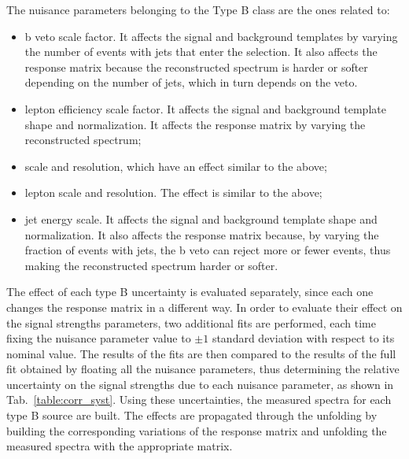 The nuisance parameters belonging to the Type B class are the ones related to:
\begin{itemize}
\item b veto scale factor. It affects the signal and background templates
by varying the number of events with jets that enter the selection. It also
affects the response matrix because the reconstructed spectrum is harder or softer depending on the number of jets, which in turn depends on the veto. 
\item lepton efficiency scale factor. It affects the signal and background
template shape and normalization. It affects the response matrix by varying
the reconstructed spectrum;
\item \MET scale and resolution, which have an effect similar to the above;
\item lepton scale and resolution. The effect is similar to the above;
\item jet energy scale. It affects the signal and background template shape
and normalization. It also affects the response matrix because, by varying the
fraction of events with jets, the b veto can reject more or fewer events, thus
making the reconstructed spectrum harder or softer.
\end{itemize}
The effect of each type B uncertainty is evaluated separately,
since each one changes the response matrix in a different way.
In order to evaluate their effect on the signal strengths parameters, two additional fits are
performed, each time fixing  the nuisance parameter value to $\pm 1$  standard
deviation with respect
to its nominal value. The results of the fits are then compared to the results of the full fit obtained by floating  all the nuisance parameters, thus 
determining the relative uncertainty on the signal strengths due to each
nuisance parameter, as shown in Tab.~\ref{table:corr_syst}. 
Using these uncertainties, the measured spectra for each type B
source are built.
The effects are propagated through the unfolding by building the corresponding variations of the response matrix and unfolding the
measured spectra with the appropriate matrix.

